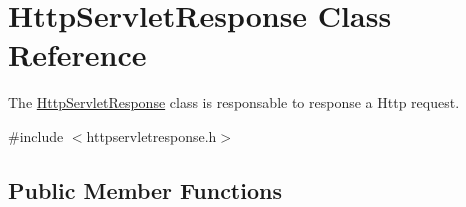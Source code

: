 \hypertarget{class_http_servlet_response}{}\section{Http\+Servlet\+Response Class Reference}
\label{class_http_servlet_response}


The \mbox{\hyperlink{class_http_servlet_response}{Http\+Servlet\+Response}} class is responsable to response a Http request.  




{\ttfamily \#include $<$httpservletresponse.\+h$>$}

\subsection*{Public Member Functions}
